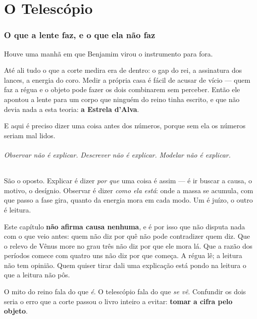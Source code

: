\documentclass[livro.tex]{subfiles}
\begin{document}


\part{O Telescópio}

\section{O que a lente faz, e o que ela não faz}

Houve uma manhã em que Benjamim virou o instrumento para fora.

Até ali tudo o que a corte medira era de dentro: o gap do rei, a assinatura
dos lances, a energia do coro. Medir a própria casa é fácil de acusar de
vício --- quem faz a régua e o objeto pode fazer os dois combinarem sem
perceber. Então ele apontou a lente para um corpo que ninguém do reino tinha
escrito, e que não devia nada a esta teoria: \textbf{a Estrela d'Alva}.

E aqui é preciso dizer uma coisa antes dos números, porque sem ela os números
seriam mal lidos.

\paragraph{Observar não é explicar. Descrever não é explicar. Modelar não é
explicar.} São o oposto. Explicar é dizer \emph{por que} uma coisa é assim ---
é ir buscar a causa, o motivo, o desígnio. Observar é dizer \emph{como ela
está}: onde a massa se acumula, com que passo a fase gira, quanto da energia
mora em cada modo. Um é juízo, o outro é leitura.

\medskip
\noindent Este capítulo \textbf{não afirma causa nenhuma}, e é por isso que não
disputa nada com o que veio antes: quem não diz por quê não pode contradizer
quem diz. Que o relevo de Vênus more no grau três não
diz por que ele mora lá. Que a razão dos períodos comece com quatro uns não diz
por que começa. A régua lê; a leitura não tem opinião. Quem quiser tirar dali
uma explicação está pondo na leitura o que a leitura não pôs.

\medskip
\noindent O mito do reino fala do que \emph{é}. O telescópio fala do que
\emph{se vê}. Confundir os dois seria o erro que a corte passou o livro inteiro
a evitar: \textbf{tomar a cifra pelo objeto}.
\end{document}
